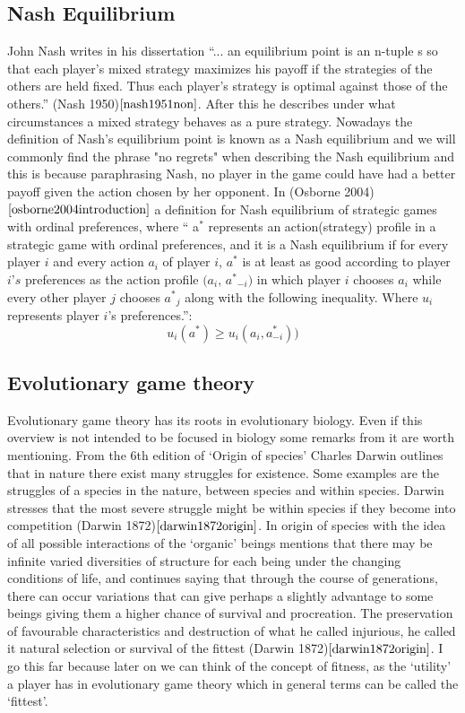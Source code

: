\documentclass{article}
\begin{document}
\subsection{Nash Equilibrium}\label{third_section}
John Nash writes in his dissertation ``... an equilibrium point is an n-tuple s so that each player's mixed strategy maximizes his payoff if the strategies of the others are held fixed. Thus each player's strategy is optimal against those of the others.'' (Nash 1950)$\cite{nash1951non}$.  After this he describes under what circumstances a mixed strategy behaves as a pure strategy. Nowadays the definition of Nash's equilibrium point is known as a Nash equilibrium and we will commonly find the phrase "no regrets" when describing the Nash equilibrium and this is because paraphrasing Nash, no player in the game could have had a better payoff given the action chosen by her opponent. In (Osborne 2004)$\cite{osborne2004introduction}$ a definition for Nash equilibrium of strategic games with ordinal preferences, where `` a$^*$ represents an action(strategy) profile in a strategic game with ordinal preferences, and it is a Nash equilibrium if for every player $\textit{i}$ and every action $\textit{a$_i$}$ of player $\textit{i}$, $\textit{a$^*$}$ is at least as good according to player $\textit{i's}$ preferences as the action profile $\textit{(a$_i$, a$^*$$_{-i}$)}$  in which player $\textit{i}$ chooses $\textit{a$_i$}$ while every other player $\textit{j}$ chooses $\textit{a$^*$$_j$}$ along with the following inequality. Where $\textit{u$_i$}$ represents player $\textit{i}$'s preferences.'':
\begin{equation}
u_i(a^*)  {\geq}  u_i(a_i, a^* _{-i}))
\end{equation}

\subsection{Evolutionary game theory}
Evolutionary game theory has its roots in evolutionary biology. Even if this overview is not intended to be focused in biology some remarks from it are worth mentioning. From the 6th edition of ‘Origin of species’ Charles Darwin outlines that in nature there exist many struggles for existence. Some examples are the struggles of a species in the nature, between species and within species. Darwin stresses that the most severe struggle might be within species if they become into competition (Darwin 1872)$\cite{darwin1872origin}$. In origin of species with the idea of all possible interactions of the `organic’ beings mentions that there may be infinite varied diversities of structure for each being under the changing conditions of life, and continues saying that through the course of generations, there can occur variations that can give perhaps a slightly advantage to some beings giving them a higher chance of survival and procreation. The preservation of favourable characteristics and destruction of what he called injurious, he called it natural selection or survival of the fittest (Darwin 1872)$\cite{darwin1872origin}$. I go this far because later on we can think of the concept of fitness, as the ‘utility’ a player has in evolutionary game theory which in general terms can be called the ‘fittest’.
\end{document}
